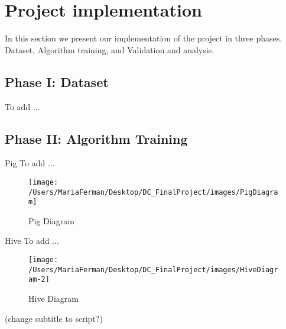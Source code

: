 

\section{Project implementation}
\label{sec:projectImplementation}
In this section we present our implementation of the project in three phases. Dataset, Algorithm training, and Validation and analysis. 

\subsection{Phase I: Dataset}
\label{sec:dataset}
To add ...



\subsection{Phase II: Algorithm Training}
\label{sec:training}

Pig To add ...
\begin{figure}[h!]
	\begin{center}
		\texttt{[image: /Users/MariaFerman/Desktop/DC\_FinalProject/images/PigDiagram]}
		\caption{Pig Diagram}
		\label{fig:dataDiagr}
	\end{center}
	\vspace{-10pt}
\end{figure}

Hive To add ...
\begin{figure}[h!]
	\begin{center}
		\texttt{[image: /Users/MariaFerman/Desktop/DC\_FinalProject/images/HiveDiagram-2]}
		\caption{Hive Diagram}
		\label{fig:dataDiagr}
	\end{center}
	\vspace{-10pt}
\end{figure}
(change subtitle to script?) 
